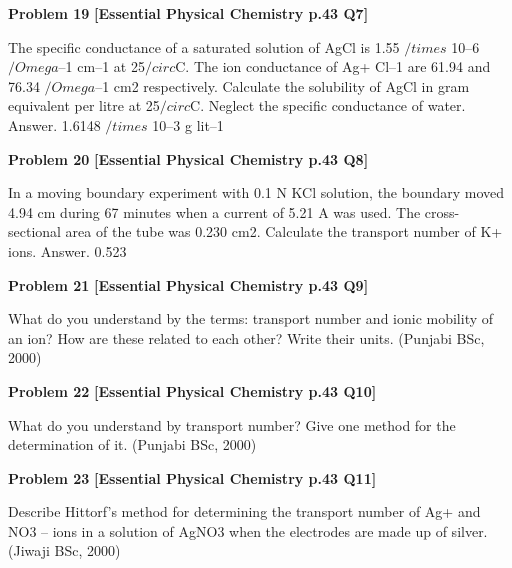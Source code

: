 \begin{problembox}
\textbf{Problem 19} \hfill \textbf{[Essential Physical Chemistry p.43 Q7]}
\label{q:ext-essential_all_questions-19}

The specific conductance of a saturated solution of AgCl is 1.55 $/times$ 10--6 $/Omega$--1 cm--1 at 25$/circ$C. The ion
conductance of Ag+ Cl--1 are 61.94 and 76.34 $/Omega$--1 cm2 respectively. Calculate the solubility of AgCl in
gram equivalent per litre at 25$/circ$C. Neglect the specific conductance of water.
Answer. 1.6148 $/times$ 10--3 g lit--1
\end{problembox}

\begin{problembox}
\textbf{Problem 20} \hfill \textbf{[Essential Physical Chemistry p.43 Q8]}
\label{q:ext-essential_all_questions-20}

In a moving boundary experiment with 0.1 N KCl solution, the boundary moved 4.94 cm during
67 minutes when a current of 5.21 A was used. The cross-sectional area of the tube was 0.230 cm2.
Calculate the transport number of K+ ions.
Answer. 0.523
\end{problembox}

\begin{problembox}
\textbf{Problem 21} \hfill \textbf{[Essential Physical Chemistry p.43 Q9]}
\label{q:ext-essential_all_questions-21}

What do you understand by the terms: transport number and ionic mobility of an ion? How are these
related to each other? Write their units.
(Punjabi BSc, 2000)
\end{problembox}

\begin{problembox}
\textbf{Problem 22} \hfill \textbf{[Essential Physical Chemistry p.43 Q10]}
\label{q:ext-essential_all_questions-22}

What do you understand by transport number? Give one method for the determination of it.
(Punjabi BSc, 2000)
\end{problembox}

\begin{problembox}
\textbf{Problem 23} \hfill \textbf{[Essential Physical Chemistry p.43 Q11]}
\label{q:ext-essential_all_questions-23}

Describe Hittorf's method for determining the transport number of Ag+ and NO3
-- ions in a solution of
AgNO3 when the electrodes are made up of silver.
(Jiwaji BSc, 2000)
\end{problembox}


